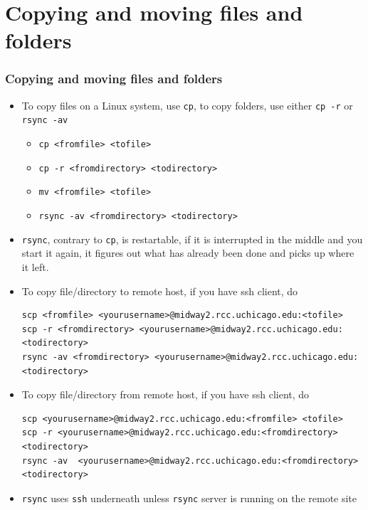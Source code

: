 \documentclass{beamer}
\begin{document}
\section{Copying and moving files and folders}
\begin{frame}[fragile]
  \frametitle{Copying and moving files and folders}
\begin{itemize}
\item To copy files on a Linux system, use {\color{mycolorcli}\verb|cp|}, to copy folders, use either {\color{mycolorcli}\verb|cp -r|} or {\color{mycolorcli}\verb|rsync -av|}
\begin{itemize}
\item {\color{mycolorcli}\verb|cp <fromfile> <tofile>|}
\item {\color{mycolorcli}\verb|cp -r <fromdirectory> <todirectory>|}
\item {\color{mycolorcli}\verb|mv <fromfile> <tofile>|}
\item {\color{mycolorcli}\verb|rsync -av <fromdirectory> <todirectory>|}
\end{itemize}
\item {\color{mycolorcli}\verb|rsync|}, contrary to {\color{mycolorcli}\verb|cp|}, is restartable, if it is interrupted in the middle and you start it again, it figures out what has already been done and picks up where it left.
\item To copy file/directory to remote host, if you have ssh client, do
{\tiny
{\color{mycolorcli}
\begin{verbatim}
scp <fromfile> <yourusername>@midway2.rcc.uchicago.edu:<tofile>
scp -r <fromdirectory> <yourusername>@midway2.rcc.uchicago.edu:<todirectory>
rsync -av <fromdirectory> <yourusername>@midway2.rcc.uchicago.edu:<todirectory>
\end{verbatim}
}
}
\item To copy file/directory from remote host, if you have ssh client, do
{\tiny
{\color{mycolorcli}
\begin{verbatim}
scp <yourusername>@midway2.rcc.uchicago.edu:<fromfile> <tofile>
scp -r <yourusername>@midway2.rcc.uchicago.edu:<fromdirectory> <todirectory>
rsync -av  <yourusername>@midway2.rcc.uchicago.edu:<fromdirectory> <todirectory>
\end{verbatim}
}
}
\item {\color{mycolorcli}\verb|rsync|} uses {\color{mycolorcli}\verb|ssh|} underneath unless {\color{mycolorcli}\verb|rsync|} server is running on the remote site
\end{itemize}
\end{frame}
\end{document}
